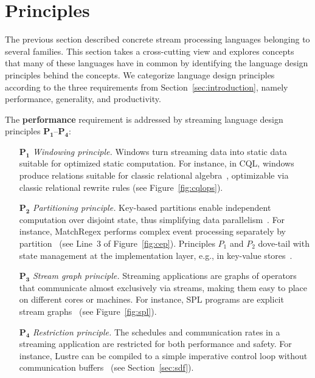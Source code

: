 \section{Principles}\label{sec:principles}

The previous section described concrete stream processing languages
belonging to several families. This section takes a cross-cutting view
and explores concepts that many of these languages have in common by
identifying the language design principles behind the concepts.
We categorize language design
principles according to the three requirements from
Section~\ref{sec:introduction}, namely performance, generality, and
productivity.

The \textbf{performance} requirement is addressed by streaming
language design principles $\mathbf{P_1}$--$\mathbf{P_4}$:
\begin{itemize}[leftmargin=6mm]
  \item[$\mathbf{P_1}$] \emph{Windowing principle.} Windows turn streaming
    data into static data suitable for optimized static computation.
    For instance, in CQL, windows produce relations suitable for
    classic relational algebra~\cite{arasu_babu_widom_2006},
    optimizable via classic relational rewrite rules (see
    Figure~\ref{fig:cqlops}).
  \item[$\mathbf{P_2}$] \emph{Partitioning principle.} Key-based partitions
    enable independent computation over disjoint state, thus
    simplifying data parallelism~\cite{schneider_et_al_2015}.
    For instance, MatchRegex performs complex event processing separately by
    partition~\cite{hirzel_2012} (see Line~3 of Figure~\ref{fig:cep}).
    Principles $P_1$ and $P_2$ dove-tail with state management at the
    implementation layer, e.g., in key-value stores~\cite{gedik_et_al_2014}.
  \item[$\mathbf{P_3}$] \emph{Stream graph principle.} Streaming
    applications are graphs of operators that communicate almost
    exclusively via streams, making them easy to place on different
    cores or machines. For instance, SPL programs are explicit stream
    graphs~\cite{hirzel_schneider_gedik_2017} (see
    Figure~\ref{fig:spl}).
  \item[$\mathbf{P_4}$] \emph{Restriction principle.} The schedules and
    communication rates in a streaming application are restricted for
    both performance and safety. For instance, Lustre can be compiled
    to a simple imperative control loop without communication
    buffers~\cite{lustre_1987} (see Section~\ref{sec:sdf}).
\end{itemize}

